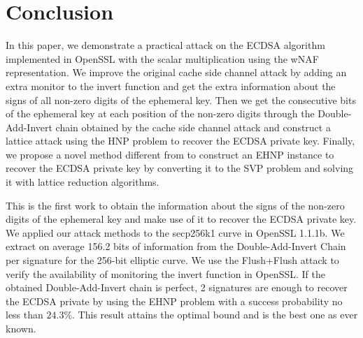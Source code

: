 \section{Conclusion}
\label{sec:conclusion}
In this paper, we demonstrate a practical attack on the ECDSA algorithm implemented in OpenSSL with the scalar multiplication using the wNAF representation.
We improve the original cache side channel attack
 by adding an extra monitor to the invert function and get the extra information about the signs of all non-zero digits of the ephemeral key.
Then we get the consecutive bits of the ephemeral key at each position of the non-zero digits through the Double-Add-Invert chain obtained by the cache side channel attack and
construct a lattice attack using the HNP problem to recover the ECDSA private key.
Finally, we propose a novel method different from \cite{Fan2016} to construct an EHNP instance to recover the ECDSA private
key by converting it to the SVP problem and solving it with lattice reduction algorithms.

This is the first work to obtain the information about the signs of the non-zero digits of the ephemeral key and make use of it to recover the ECDSA private key.
We applied our attack methods to the secp256k1 curve in OpenSSL 1.1.1b.
We extract on average 156.2 bits of information from the Double-Add-Invert Chain per signature for the 256-bit elliptic curve. We use the Flush+Flush attack to verify the availability of monitoring the invert function in OpenSSL. 
If the obtained Double-Add-Invert chain is perfect, 
2 signatures are enough to recover the ECDSA private by using the EHNP problem with a success probability no less than $24.3\%$.
This result attains the optimal bound and is the best one as ever known.






